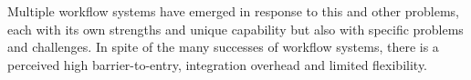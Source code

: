 \documentclass[conference]{IEEEtran}
\begin{document}
Multiple workflow systems have emerged in response to this and other
problems, each with its own strengths and unique capability but also with
specific problems and challenges. In spite of the many successes of workflow
systems, there is a perceived high barrier-to-entry, integration overhead and
limited flexibility.





\end{document}

